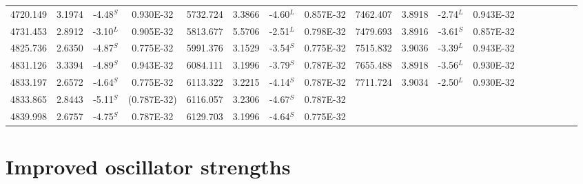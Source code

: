 \documentclass[traditabstract]{aa} %
\begin{document}
\begin{table}
\begin{minipage}[t]{\textwidth}
\begin{tabular}{cccccccccccccccccc}
 4720.149 & 3.1974 &-4.48$^S$ & 0.930E-32  & 5732.724 & 3.3866 &-4.60$^L$ & 0.857E-32  & 7462.407 & 3.8918 &-2.74$^L$ & 0.943E-32  \\   
 4731.453 & 2.8912 &-3.10$^L$ & 0.905E-32  & 5813.677 & 5.5706 &-2.51$^L$ & 0.798E-32  & 7479.693 & 3.8916 &-3.61$^S$ & 0.857E-32  \\   
 4825.736 & 2.6350 &-4.87$^S$ & 0.775E-32  & 5991.376 & 3.1529 &-3.54$^S$ & 0.775E-32  & 7515.832 & 3.9036 &-3.39$^L$ & 0.943E-32  \\   
 4831.126 & 3.3394 &-4.89$^S$ & 0.943E-32  & 6084.111 & 3.1996 &-3.79$^S$ & 0.787E-32  & 7655.488 & 3.8918 &-3.56$^L$ & 0.930E-32  \\   
 4833.197 & 2.6572 &-4.64$^S$ & 0.775E-32  & 6113.322 & 3.2215 &-4.14$^S$ & 0.787E-32  & 7711.724 & 3.9034 &-2.50$^L$ & 0.930E-32  \\   
 4833.865 & 2.8443 &-5.11$^S$ & (0.787E-32)& 6116.057 & 3.2306 &-4.67$^S$ & 0.787E-32  &          &        &         &   \\   
 4839.998 & 2.6757 &-4.75$^S$ & 0.787E-32  & 6129.703 & 3.1996 &-4.64$^S$ & 0.775E-32  &          &        &         &   \\   
\hline                                 
\hline                                 
\end{tabular}                
\end{minipage}
\end{table}


\section{Improved oscillator strengths}
\end{document}
